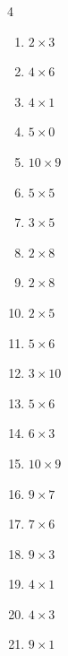 \begin{multicols}{4}
\begin{enumerate}
  \item $2\times 3$
        \phantom{$=6$}

  \item $4\times 6$
        \phantom{$=24$}

  \item $4\times 1$
        \phantom{$=4$}

  \item $5\times 0$
        \phantom{$=0$}

  \item $10\times 9$
        \phantom{$=90$}

  \item $5\times 5$
        \phantom{$=25$}

  \item $3\times 5$
        \phantom{$=15$}

  \item $2\times 8$
        \phantom{$=16$}

  \item $2\times 8$
        \phantom{$=16$}

  \item $2\times 5$
        \phantom{$=10$}

  \item $5\times 6$
        \phantom{$=30$}

  \item $3\times 10$
        \phantom{$=30$}

  \item $5\times 6$
        \phantom{$=30$}

  \item $6\times 3$
        \phantom{$=18$}

  \item $10\times 9$
        \phantom{$=90$}

  \item $9\times 7$
        \phantom{$=63$}

  \item $7\times 6$
        \phantom{$=42$}

\columnbreak %

  \item $9\times 3$
        \phantom{$=27$}

  \item $4\times 1$
        \phantom{$=4$}

  \item $4\times 3$
        \phantom{$=12$}

  \item $9\times 1$
        \phantom{$=9$}


\end{enumerate}
\end{multicols}
